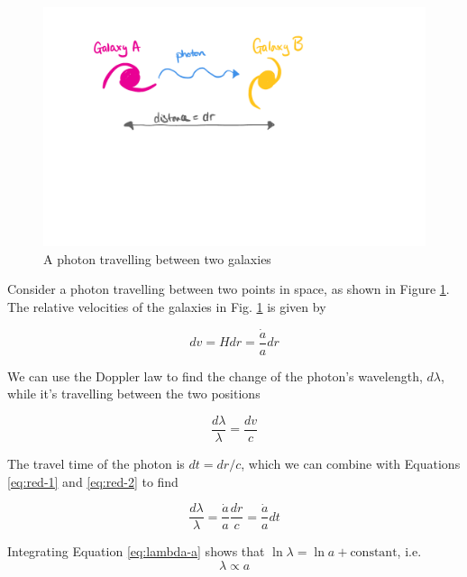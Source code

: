 \documentclass[11pt,a4paper]{book}
\begin{document}
\begin{figure}
\includegraphics[width=1\linewidth]{Images/redshift-galaxies} \caption{A photon travelling between two galaxies}\label{fig:redshift-galaxies}
\end{figure}

Consider a photon travelling between two points in space, as shown in
Figure \ref{fig:redshift-galaxies}. The relative velocities of the
galaxies in
Fig. \ref{fig:redshift-galaxies} is given by

\begin{equation}
dv = H dr = \dfrac{\dot{a}}{a} dr
\label{eq:red-1}
\end{equation}

We can use the Doppler law to
find the change of the photon's wavelength, \(d\lambda\), while it's
travelling between the two positions

\begin{equation}
\dfrac{d\lambda}{\lambda} = \dfrac{dv}{c}
\label{eq:red-2}
\end{equation}

The travel time of the
photon is \(dt = dr/c\), which we can combine with
Equations \eqref{eq:red-1} and \eqref{eq:red-2}
to find

\begin{equation}
\dfrac{d\lambda}{\lambda} = \dfrac{\dot{a}}{a} \dfrac{dr}{c} = \dfrac{\dot{a}}{a} dt
\label{eq:lambda-a}
\end{equation}

Integrating Equation \eqref{eq:lambda-a} shows that
\(\ln \lambda = \ln a + \text{constant}\), i.e.
\begin{equation}
\lambda \propto a
\label{eq:lambda-a-2}
\end{equation}
\end{document}
